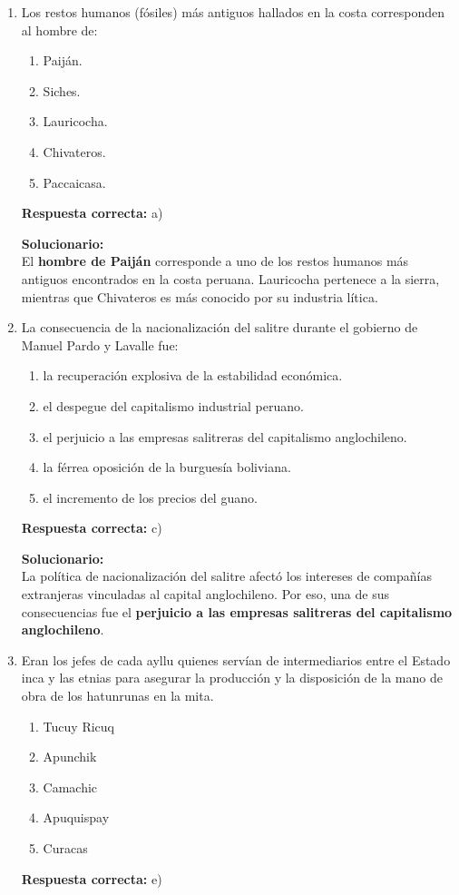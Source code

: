 \begin{enumerate}
	
	\item Los restos humanos (fósiles) más antiguos hallados en la costa corresponden al hombre de:
	\begin{enumerate}[label=\alph*)]
		\item Paiján.
		\item Siches.
		\item Lauricocha.
		\item Chivateros.
		\item Paccaicasa.
	\end{enumerate}
	\textbf{Respuesta correcta:} a)
	
	\vspace{2mm}
	\textbf{Solucionario:}\\
	El \textbf{hombre de Paiján} corresponde a uno de los restos humanos más antiguos encontrados en la costa peruana. Lauricocha pertenece a la sierra, mientras que Chivateros es más conocido por su industria lítica.
	
	\vspace{6mm}
	
	\item La consecuencia de la nacionalización del salitre durante el gobierno de Manuel Pardo y Lavalle fue:
	\begin{enumerate}[label=\alph*)]
		\item la recuperación explosiva de la estabilidad económica.
		\item el despegue del capitalismo industrial peruano.
		\item el perjuicio a las empresas salitreras del capitalismo anglochileno.
		\item la férrea oposición de la burguesía boliviana.
		\item el incremento de los precios del guano.
	\end{enumerate}
	\textbf{Respuesta correcta:} c)
	
	\vspace{2mm}
	\textbf{Solucionario:}\\
	La política de nacionalización del salitre afectó los intereses de compañías extranjeras vinculadas al capital anglochileno. Por eso, una de sus consecuencias fue el \textbf{perjuicio a las empresas salitreras del capitalismo anglochileno}.
	
	\vspace{6mm}
	
	\item Eran los jefes de cada ayllu quienes servían de intermediarios entre el Estado inca y las etnias para asegurar la producción y la disposición de la mano de obra de los hatunrunas en la mita.
	\begin{enumerate}[label=\alph*)]
		\item Tucuy Ricuq
		\item Apunchik
		\item Camachic
		\item Apuquispay
		\item Curacas
	\end{enumerate}
	\textbf{Respuesta correcta:} e)
	

\end{enumerate}
